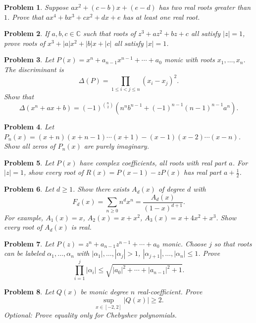 \documentclass[12pt]{article}
\newtheorem{problem}{Problem}
\begin{document}
\begin{problem}
Suppose $ax^2+(c-b)x+(e-d)$ has two real roots greater than $1$. Prove that $ax^4+bx^3+cx^2+dx+e$ has at least one real root.
\end{problem}

\begin{problem}
If $a,b,c\in\mathbb{C}$ such that roots of $z^3+az^2+bz+c$ all satisfy $|z|=1$, prove roots of $x^3+|a|x^2+|b|x+|c|$ all satisfy $|x|=1$.
\end{problem}

\begin{problem}
Let $P(x)=x^n+a_{n-1}x^{n-1}+\cdots+a_0$ monic with roots $x_1,\dots,x_n$. The discriminant is
\[
\Delta(P)=\prod_{1\leq i<j\leq n}(x_i-x_j)^2.
\]
Show that
\[
\Delta(x^n+ax+b)=(-1)^{\binom{n}{2}}\left(n^n b^{n-1}+(-1)^{n-1}(n-1)^{n-1}a^n\right).
\]
\end{problem}

\begin{problem}
Let $P_n(x)=(x+n)(x+n-1)\cdots(x+1)-(x-1)(x-2)\cdots(x-n)$. Show all zeros of $P_n(x)$ are purely imaginary.
\end{problem}

\begin{problem}
Let $P(x)$ have complex coefficients, all roots with real part $a$. For $|z|=1$, show every root of $R(x)=P(x-1)-zP(x)$ has real part $a+\tfrac{1}{2}$.
\end{problem}

\begin{problem}
Let $d\geq1$. Show there exists $A_d(x)$ of degree $d$ with
\[
F_d(x)=\sum_{n\geq0} n^d x^n = \frac{A_d(x)}{(1-x)^{d+1}}.
\]
For example, $A_1(x)=x$, $A_2(x)=x+x^2$, $A_3(x)=x+4x^2+x^3$. Show every root of $A_d(x)$ is real.
\end{problem}

\begin{problem}
Let $P(z)=z^n+a_{n-1}z^{n-1}+\cdots+a_0$ monic. Choose $j$ so that roots can be labeled $\alpha_1,\dots,\alpha_n$ with $|\alpha_1|,\dots,|\alpha_j|>1$, $|\alpha_{j+1}|,\dots,|\alpha_n|\leq1$. Prove
\[
\prod_{i=1}^j|\alpha_i|\leq \sqrt{|a_0|^2+\cdots+|a_{n-1}|^2+1}.
\]
\end{problem}

\begin{problem}
Let $Q(x)$ be monic degree $n$ real-coefficient. Prove
\[
\sup_{x\in[-2,2]}|Q(x)|\geq2.
\]
Optional: Prove equality only for Chebyshev polynomials.
\end{problem}
\end{document}
